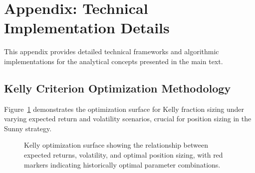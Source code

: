 \documentclass[
  american,
  11pt,
  11pt,
  letterpaper,
  onecolumn]{article}
\begin{document}
\newpage

\section{Appendix: Technical Implementation
Details}\label{appendix-technical-implementation-details}

This appendix provides detailed technical frameworks and algorithmic
implementations for the analytical concepts presented in the main text.

\subsection{Kelly Criterion Optimization
Methodology}\label{kelly-criterion-optimization-methodology}

Figure~\ref{fig-kelly-optimization} demonstrates the optimization
surface for Kelly fraction sizing under varying expected return and
volatility scenarios, crucial for position sizing in the Sunny strategy.

\begin{figure}[H]


\caption{\label{fig-kelly-optimization}Kelly optimization surface
showing the relationship between expected returns, volatility, and
optimal position sizing, with red markers indicating historically
optimal parameter combinations.}

\end{figure}%
\end{document}
